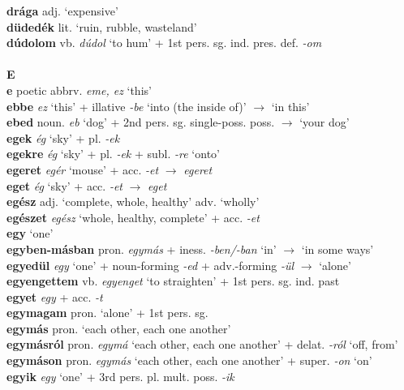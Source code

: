 \documentclass[11pt]{article}
\begin{document}
\textbf{drága} adj. `expensive' \\
\textbf{düdedék} lit. `ruin, rubble, wasteland' \\
\textbf{dúdolom} vb. \emph{dúdol} `to hum' + 1st
pers. sg. ind. pres. def. \emph{-om} \\
\ \\
\noindent \textbf{\large E} \\
\textbf{e} poetic abbrv. \emph{eme, ez} `this' \\
\textbf{ebbe} \emph{ez} `this' + illative \emph{-be}
`into (the inside of)' $\rightarrow$ `in this' \\
\textbf{ebed} noun. \emph{eb} `dog' + 2nd
pers. sg. single\hyp{}poss. poss. $\rightarrow$ `your dog' \\
\textbf{egek} \emph{ég} `sky' + pl. \emph{-ek} \\
\textbf{egekre} \emph{ég} `sky' + pl. \emph{-ek} + subl. \emph{-re} `onto' \\
\textbf{egeret} \emph{egér} `mouse' + acc. \emph{-et}
$\rightarrow$ \emph{egeret} \\
\textbf{eget} \emph{ég} `sky' + acc. \emph{-et} $\rightarrow$
  \emph{eget} \\
\textbf{egész} adj. `complete, whole, healthy' \textbar\textbar{}
adv. `wholly' \\
\textbf{egészet} \emph{egész} `whole, healthy, complete' +
acc. \emph{-et} \\
\textbf{egy} `one' \\
\textbf{egyben-másban} pron. \emph{egymás} + iness. \emph{-ben/-ban}
`in' $\rightarrow$ `in some ways' \\
\textbf{egyedül} \emph{egy} `one' + noun\hyp{}forming \emph{-ed} +
adv.\hyp{}forming \emph{-ül} $\rightarrow$ `alone' \\
\textbf{egyengettem} vb. \emph{egyenget} `to straighten' + 1st
pers. sg. ind. past \\
\textbf{egyet} \emph{egy} + acc. \emph{-t} \\
\textbf{egymagam} pron. `alone' + 1st pers. sg. \\
\textbf{egymás} pron. `each other, each one another' \\
\textbf{egymásról} pron. \emph{egymá} `each other, each one another' +
delat. \emph{-ról} `off, from' \\
\textbf{egymáson} pron. \emph{egymás} `each other, each one
another' + super. \emph{-on} `on' \\
\textbf{egyik} \emph{egy} `one' + 3rd pers. pl. mult. poss. \emph{-ik}
\end{document}
